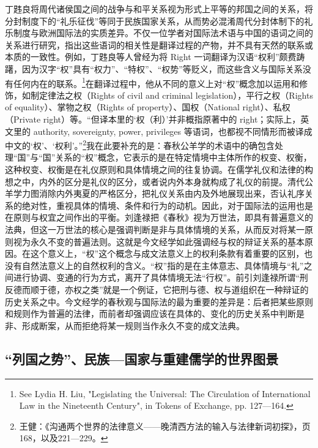 \documentclass[a4paper, 12pt, openright]{ctexbook}
\begin{document}
丁韪良将周代诸侯国之间的战争与和平关系视为形式上平等的邦国之间的关系，将分封制度下的“礼乐征伐”等同于民族国家关系，从而势必混淆周代分封体制下的礼乐制度与欧洲国际法的实质差异。不仅一位学者对国际法术语与中国的语词之间的关系进行研究，指出这些语词的相关性是翻译过程的产物，并不具有天然的联系或本质的一致性。例如，丁韪良等人曾经为将 Right 一词翻译为汉语“权利”颇费踌躇，因为汉字“权”具有“权力”、“特权”、“权势”等贬义，而这些含义与国际关系没有任何内在的联系。\footnote{See Lydia H. Liu, "Legislating the Universal: The Circulation of International Law in the Nineteenth Century", in Tokens of Exchange, pp. 127—164.}在翻译过程中，他从不同的意义上对“权”概念加以运用和修饰，如制定律法之权（Rights of civil and criminal legislation），平行之权（Rights of equality）、掌物之权（Rights of property）、国权（National right）、私权（Private right）等。“但译本里的‘权（利）’并非概指原著中的 right；实际上，英文里的 authority, sovereignty, power, privileges 等语词，也都视不同情形而被译成中文的‘权’、‘权利’。”\footnote{王健：《沟通两个世界的法律意义——晚清西方法的输入与法律新词初探》，页168，以及221—229。}我在此要补充的是：春秋公羊学的术语中的确包含处理“国”与“国”关系的“权”概念，它表示的是在特定情境中主体所作的权变、权衡，这种权变、权衡是在礼仪原则和具体情境之间的往复协调。在儒学礼仪和法律的构想之中，内外的区分是礼仪的区分，或者说内外本身就构成了礼仪的前提。清代公羊学力图消除内外夷夏的严格区分，把礼仪关系由内及外地展现出来，否认礼序关系的绝对性，重视具体的情境、条件和行为的动机。因此，对于国际法的运用也是在原则与权宜之间作出的平衡。刘逢禄把《春秋》视为万世法，即具有普遍意义的法典，但这一万世法的核心是强调判断是非与具体情境的关系，从而反对将某一原则视为永久不变的普遍法则。这就是今文经学如此强调经与权的辩证关系的基本原因。在这个意义上，“权”这个概念与成文法意义上的权利条款有着重要的区别，也没有自然法意义上的自然权利的含义。“权”指的是在主体意志、具体情境与“礼”之间进行协调、变通的行为方式，离开了具体情境无法“行权”。前引刘逢禄所谓“刑反德而顺于德，亦权之类”就是一个例证，它把刑与德、权与道组织在一种辩证的历史关系之中。今文经学的春秋观与国际法的最为重要的差异是：后者把某些原则和规则作为普遍的法律，而前者却强调应该在具体的、变化的历史关系中判断是非、形成断案，从而拒绝将某一规则当作永久不变的成文法典。

\subsection{“列国之势”、民族—国家与重建儒学的世界图景}
\end{document}
